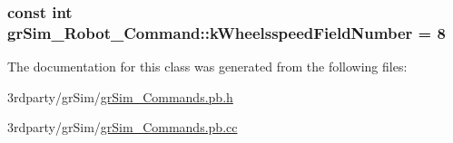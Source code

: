 \hypertarget{classgr_sim___robot___command_a9aec2c96d1c4d23fad97bbf924b7e06a}{
\subsubsection[{k\-Wheelsspeed\-Field\-Number}]{\setlength{\rightskip}{0pt plus 5cm}const int gr\-Sim\-\_\-\-Robot\-\_\-\-Command\-::k\-Wheelsspeed\-Field\-Number = 8\hspace{0.3cm}{\ttfamily [static]}}}\label{classgr_sim___robot___command_a9aec2c96d1c4d23fad97bbf924b7e06a}


The documentation for this class was generated from the following files\-:\begin{DoxyCompactItemize}
\item 
3rdparty/gr\-Sim/\hyperlink{gr_sim___commands_8pb_8h}{gr\-Sim\-\_\-\-Commands.\-pb.\-h}\item 
3rdparty/gr\-Sim/\hyperlink{gr_sim___commands_8pb_8cc}{gr\-Sim\-\_\-\-Commands.\-pb.\-cc}\end{DoxyCompactItemize}
